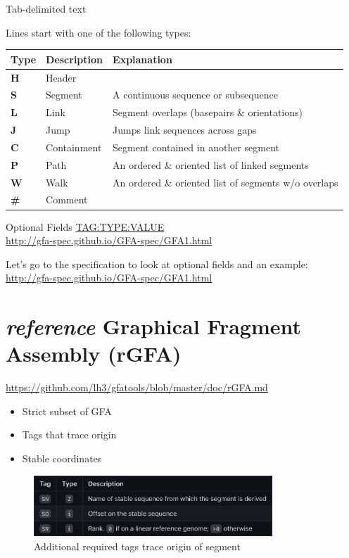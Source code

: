 \documentclass[
]{book}
\providecommand{\tightlist}{%
  \setlength{\itemsep}{0pt}\setlength{\parskip}{0pt}}
\begin{document}
Tab-delimited text

Lines start with one of the following types:

\begin{longtable}[]{@{}lll@{}}
\toprule
Type & Description & Explanation \\
\midrule
\endhead
\textbf{H} & Header & \\
\textbf{S} & Segment & A continuous sequence or subsequence \\
\textbf{L} & Link & Segment overlaps (basepairs \& orientations) \\
\textbf{J} & Jump & Jumps link sequences across gaps \\
\textbf{C} & Containment & Segment contained in another segment \\
\textbf{P} & Path & An ordered \& oriented list of linked segments \\
\textbf{W} & Walk & An ordered \& oriented list of segments w/o overlaps \\
\textbf{\#} & Comment & \\
\bottomrule
\end{longtable}

Optional Fields \url{TAG:TYPE:VALUE}\\
\url{http://gfa-spec.github.io/GFA-spec/GFA1.html}

Let's go to the specification to look at optional fields and an example:\\
\url{http://gfa-spec.github.io/GFA-spec/GFA1.html}

\hypertarget{reference-graphical-fragment-assembly-rgfa}{%
\section{\texorpdfstring{\emph{reference} Graphical Fragment Assembly (rGFA)}{reference Graphical Fragment Assembly (rGFA)}}\label{reference-graphical-fragment-assembly-rgfa}}

\url{https://github.com/lh3/gfatools/blob/master/doc/rGFA.md}

\begin{itemize}
\tightlist
\item
  Strict subset of GFA
\item
  Tags that trace origin
\item
  Stable coordinates
\end{itemize}

\begin{figure}
\centering
\includegraphics[width=0.8\textwidth,height=\textheight]{./Figures/rGFA1.png}
\caption{Additional required tags trace origin of segment}
\end{figure}
\end{document}
